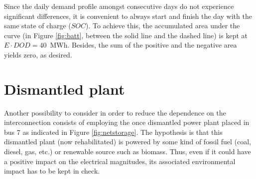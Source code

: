 Since the daily demand profile amongst consecutive days do not experience significant differences, it is convenient to always start and finish the day with the same state of charge ($SOC$). To achieve this, the accumulated area under the curve (in Figure \ref{fig:batt}, between the solid line and the dashed line) is kept at $E \cdot DOD=40$~MWh. Besides, the sum of the positive and the negative area yields zero, as desired. 


\section{Dismantled plant}
Another possibility to consider in order to reduce the dependence on the interconnection consists of employing the once dismantled power plant placed in bus 7 as indicated in Figure \ref{fig:netstorage}. The hypothesis is that this dismantled plant (now rehabilitated) is powered by some kind of fossil fuel (coal, diesel, gas, etc.) or renewable source such as biomass. Thus, even if it could have a positive impact on the electrical magnitudes, its associated environmental impact has to be kept in check. 

